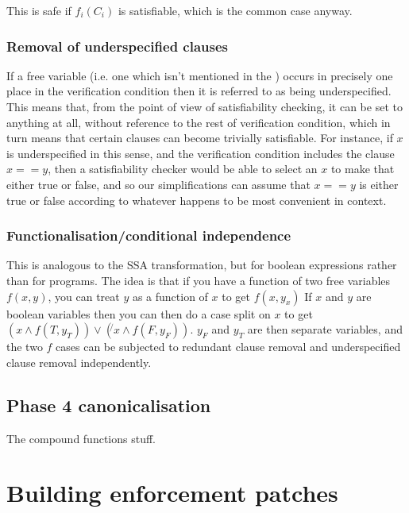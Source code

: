 \documentclass[12pt,a4paper]{book}
\begin{document}
This is safe if $f_i(C_i)$ is satisfiable, which is the common case anyway.

\subsubsection{Removal of underspecified clauses}

If a free variable (i.e. one which isn't mentioned in the \StateMachines) occurs in precisely one place in the verification condition then it is referred to as being underspecified.
This means that, from the point of view of satisfiability checking, it can be set to anything at all, without reference to the rest of verification condition, which in turn means that certain clauses can become trivially satisfiable.
For instance, if $x$ is underspecified in this sense, and the verification condition includes the clause $x == y$, then a satisfiability checker would be able to select an $x$ to make that either true or false, and so our simplifications can assume that $x == y$ is either true or false according to whatever happens to be most convenient in context.

\subsubsection{Functionalisation/conditional independence}

This is analogous to the SSA transformation, but for boolean expressions rather than for programs.
The idea is that if you have a function of two free variables $f(x, y)$, you can treat $y$ as a function of $x$ to get $f(x, y_x)$
If $x$ and $y$ are boolean variables then you can then do a case split on $x$ to get $(x \wedge f(T, y_T)) \vee (\not{}x \wedge f(F, y_F))$.
$y_F$ and $y_T$ are then separate variables, and the two $f$ cases can be subjected to redundant clause removal and underspecified clause removal independently.


\subsection{Phase 4 canonicalisation}
The compound functions stuff.

\section{Building enforcement patches}
\end{document}
